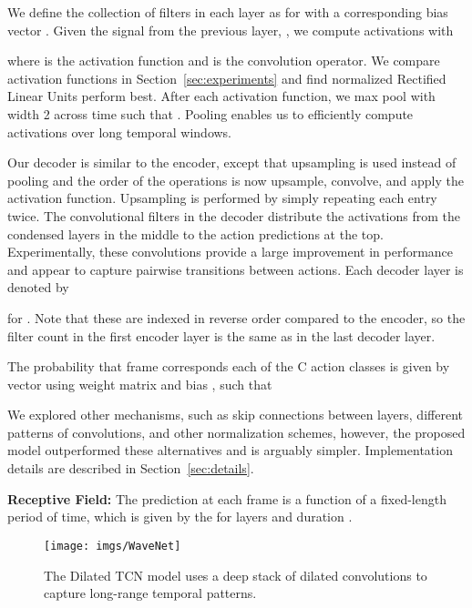 \documentclass[10pt,twocolumn,letterpaper]{article}
\newcommand{\fakesubsection}[1]{\smallskip\noindent\textbf{#1:}}
\begin{document}
We define the collection of filters in each layer as  for  with a corresponding bias vector
. 
Given the signal from the previous layer, , we compute activations  with

where  is the activation function and   is the convolution operator. We compare activation functions in Section~\ref{sec:experiments} and find normalized Rectified Linear Units perform best.
After each activation function, we max pool with width 2 across time such that . 
Pooling enables us to efficiently compute activations over long temporal windows.


Our decoder is similar to the encoder, except that upsampling is used instead of pooling and the order of the operations is now upsample, convolve, and apply the activation function. 
Upsampling is performed by simply repeating each entry twice. The convolutional filters in the decoder distribute the activations from the condensed layers in the middle to the action predictions at the top.
Experimentally, these convolutions provide a large improvement in performance and appear to capture pairwise transitions between actions. 
Each decoder layer is denoted by 

for . Note that these are indexed in reverse order compared to the encoder, so the filter count in the first encoder layer is the same as in the last decoder layer. 






The probability that frame  corresponds each of the C action classes is given by vector  using weight matrix  and bias , such that



We explored other mechanisms, such as skip connections between layers, different patterns of convolutions, and other normalization schemes, however, the proposed model outperformed these alternatives and is arguably simpler. 
Implementation details are described in Section~\ref{sec:details}.

\fakesubsection{Receptive Field}
The prediction at each frame is a function of a fixed-length period of time, which is given by
the  for  layers and duration . 










\begin{figure}
	\centering
	\texttt{[image: imgs/WaveNet]}		    
	\caption{The Dilated TCN model uses a deep stack of dilated convolutions to capture long-range temporal patterns. }
	\label{fig:WaveNet}
\end{figure}
\end{document}
